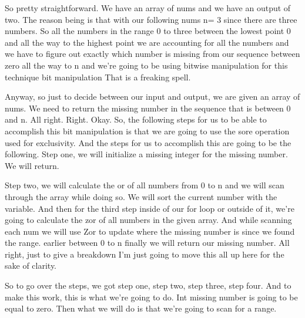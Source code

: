 \expandafter\def\csname sourceexcerpt@48\endcsname{%
So pretty straightforward. We have an array of nums and we have an output of two. The
reason being is that with our following nums n= 3 since there are three numbers. So
all the numbers in the range 0 to three between the lowest point 0 and all the way to
the highest point we are accounting for all the numbers and we have to figure out
exactly which number is missing from our sequence between zero all the way to n and
we're going to be using bitwise manipulation for this technique bit manipulation That
is a freaking spell.

Anyway, so just to decide between our input and output, we are given an array of nums.
We need to return the missing number in the sequence that is between 0 and n. All
right. Right. Okay. So, the following steps for us to be able to accomplish this bit
manipulation is that we are going to use the sore operation used for exclusivity. And
the steps for us to accomplish this are going to be the following. Step one, we will
initialize a missing integer for the missing number. We will return.

Step two, we will calculate the or of all numbers from 0 to n and we will scan through
the array while doing so. We will sort the current number with the variable. And then
for the third step inside of our for loop or outside of it, we're going to calculate
the zor of all numbers in the given array. And while scanning each num we will use Zor
to update where the missing number is since we found the range. earlier between 0 to n
finally we will return our missing number. All right, just to give a breakdown I'm
just going to move this all up here for the sake of clarity.

So to go over the steps, we got step one, step two, step three, step four. And to make
this work, this is what we're going to do. Int missing number is going to be equal to
zero. Then what we will do is that we're going to scan for a range.
}

